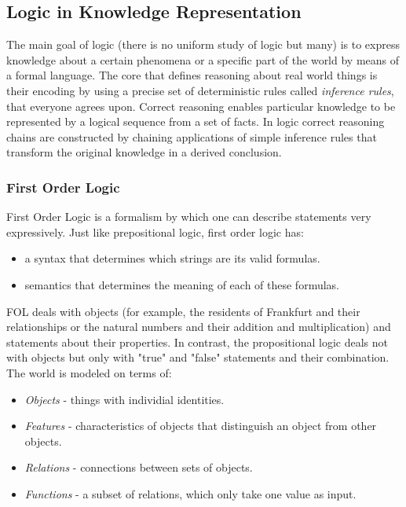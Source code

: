 \subsection{Logic in Knowledge Representation}
The main goal of logic (there is no uniform study of logic but many) is to express knowledge about a certain phenomena or a specific part of the world by means of a formal language. The core that defines reasoning about real world things is their encoding by using a precise set of deterministic rules called \textit{inference rules}, that everyone agrees upon. Correct reasoning enables particular knowledge to be represented by a logical sequence from a set of facts. In logic correct reasoning chains are constructed by chaining applications of simple inference rules that transform the original knowledge in a derived conclusion. 

\subsubsection{First Order Logic}
First Order Logic is a formalism by which one can describe statements very expressively. Just like prepositional logic, first order logic has:

\begin{itemize}
    \item a syntax that determines which strings are its valid formulas.
    \item semantics that determines the meaning of each of these formulas.
\end{itemize}

FOL deals with objects (for example, the residents of Frankfurt and their relationships or the natural numbers and their addition and multiplication) and statements about their properties. In contrast, the propositional logic deals not with objects but only with "true" and "false" statements and their combination.
The world is modeled on terms of:

\begin{itemize}
    \item \textit{Objects} - things with individial identities.
    \item \textit{Features} - characteristics of objects that distinguish an object from other objects.
    \item \textit{Relations} - connections between sets of objects.
    \item \textit{Functions} - a subset of relations, which only take one value as input.
\end{itemize}

